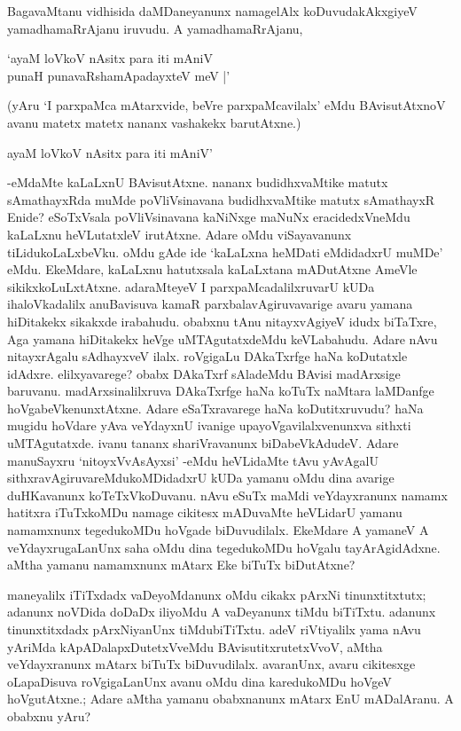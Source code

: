 BagavaMtanu vidhisida daMDaneyanunx namagelAlx koDuvudakAkxgiyeV yamadhamaRrAjanu iruvudu. A yamadhamaRrAjanu,

\begin{shloka}
`ayaM loVkoV nAsitx para iti mAniV\\
punaH punavaRshamApadayxteV meV |'
\end{shloka}

(yAru `I parxpaMca mAtarxvide, beVre parxpaMcavilalx' eMdu BAvisutAtxnoV avanu matetx matetx nananx vashakekx barutAtxne.)

\begin{shloka}
ayaM loVkoV nAsitx para iti mAniV'
\end{shloka}

-eMdaMte kaLaLxnU BAvisutAtxne. nananx budidhxvaMtike matutx sAmathayxRda muMde poVliVsinavana budidhxvaMtike matutx sAmathayxR Enide? eSoTxVsala poVliVsinavana kaNiNxge maNuNx eracidedxVneMdu kaLaLxnu heVLutatxleV irutAtxne. Adare oMdu viSayavanunx tiLidukoLaLxbeVku. oMdu gAde ide `kaLaLxna heMDati eMdidadxrU muMDe' eMdu. EkeMdare, kaLaLxnu hatutxsala kaLaLxtana mADutAtxne AmeVle sikikxkoLuLxtAtxne. adaraMteyeV I parxpaMcadalilxruvarU kUDa ihaloVkadalilx anuBavisuva kamaR parxbalavAgiruvavarige avaru yamana hiDitakekx sikakxde irabahudu. obabxnu tAnu nitayxvAgiyeV idudx biTaTxre, Aga yamana hiDitakekx heVge uMTAgutatxdeMdu keVLabahudu. Adare nAvu nitayxrAgalu sAdhayxveV ilalx. roVgigaLu DAkaTxrfge haNa koDutatxle idAdxre. elilxyavarege? obabx DAkaTxrf sAladeMdu BAvisi madArxsige baruvanu. madArxsinalilxruva DAkaTxrfge haNa koTuTx naMtara laMDanfge hoVgabeVkenunxtAtxne. Adare eSaTxravarege haNa koDutitxruvudu? haNa mugidu hoVdare yAva veYdayxnU ivanige upayoVgavilalxvenunxva sithxti uMTAgutatxde. ivanu tananx shariVravanunx biDabeVkAdudeV. Adare manuSayxru `nitoyxVvAsAyxsi' -eMdu heVLidaMte tAvu yAvAgalU sithxravAgiruvareMdukoMDidadxrU kUDa yamanu oMdu dina avarige duHKavanunx koTeTxVkoDuvanu. nAvu eSuTx maMdi veYdayxranunx namamx hatitxra iTuTxkoMDu namage cikitesx mADuvaMte heVLidarU yamanu namamxnunx tegedukoMDu hoVgade biDuvudilalx. EkeMdare A yamaneV A veYdayxrugaLanUnx saha oMdu dina tegedukoMDu hoVgalu tayArAgidAdxne. aMtha yamanu namamxnunx mAtarx Eke biTuTx biDutAtxne?

maneyalilx iTiTxdadx vaDeyoMdanunx oMdu cikakx pArxNi tinunxtitxtutx; adanunx noVDida doDaDx  iliyoMdu A vaDeyanunx tiMdu biTiTxtu. adanunx tinunxtitxdadx pArxNiyanUnx tiMdubiTiTxtu. adeV riVtiyalilx yama nAvu yAriMda kApADalapxDutetxVveMdu BAvisutitxrutetxVvoV, aMtha veYdayxranunx mAtarx biTuTx biDuvudilalx. avaranUnx, avaru cikitesxge oLapaDisuva roVgigaLanUnx avanu oMdu dina karedukoMDu hoVgeV hoVgutAtxne.; Adare aMtha yamanu obabxnanunx mAtarx EnU mADalAranu. A obabxnu yAru?

